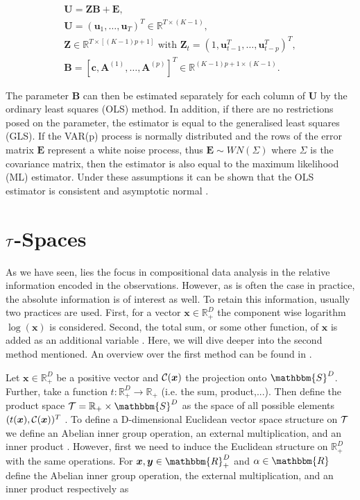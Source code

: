 \begin{gather*}
\textbf{U} = \textbf{ZB} + \textbf{E}, \\
\textbf{U} = (\textbf{u}_1,\ldots,\textbf{u}_T)^T \in \mathbb{R}^{T \times (K-1)}, \\
\textbf{Z} \in \mathbb{R}^{T \times \left[(K-1)p+1\right]} \text{ with } \textbf{Z}_t = \left(1,\textbf{u}_{t-1}^T,\ldots,\textbf{u}_{t-p}^T\right)^T, \\ %
\textbf{B} = \left[\textbf{c},\textbf{A}^{(1)}, \ldots, \textbf{A}^{(p)}\right]^T \in \mathbb{R}^{(K-1)p +1 \times (K-1)}.
\label{eq:VAR model matrix}
\end{gather*}


The parameter $\textbf{B}$ can then be estimated separately for each column of $\textbf{U}$ by the ordinary least squares (OLS) method. In addition, if there are no restrictions posed on the parameter, the estimator is equal to the generalised least squares (GLS). If the VAR(p) process is normally distributed and the rows of the error matrix $\textbf{E}$ represent a white noise process, thus $\bm{E} \sim WN(\Sigma)$ where $\Sigma$ is the covariance matrix, then the estimator is also equal to the maximum likelihood (ML) estimator. 
Under these assumptions it can be shown that the OLS estimator is consistent and asymptotic normal \cite{Kynclova:2015} \cite{Luetkepohl:2007}. 


\section{$\mathcal{T}$-Spaces}
\label{sec: Tspaces}

As we have seen, lies the focus in compositional data analysis in the relative information encoded in the observations. However, as is often the case in practice, the absolute information is of interest as well. To retain this information, usually two practices are used. First, for a vector $\bm{x} \in \mathbb{R}^D_+$ the component wise logarithm $\log(\bm{x})$ is considered. Second, the total sum, or some other function, of $\bm{x}$ is added as an additional variable \cite{Pawlowsky:2013}. Here, we will dive deeper into the second method mentioned. An overview over the first method can be found in \cite{Pawlowsky:2013}. 

Let $\bm{x} \in \mathbb{R}^D_+$ be a positive vector and $\mathcal{C}(\bm{x})$ the projection onto $\mathbbm{S}^D$. Further, take a function $t:\mathbb{R}^D_+ \longrightarrow \mathbb{R}_+$ (i.e. the sum, product,...). Then define the product space  $\Tsp = \mathbb{R}_+ \times \mathbbm{S}^D$ as the space of all possible elements $(t(\bm{x}),\mathcal{C}(\bm{x}))^T$ \cite{Pawlowsky:2013}. To define a D-dimensional Euclidean vector space structure on $\mathcal{T}$ we define an Abelian inner group operation, an external multiplication, and an inner product \cite{Pawlowsky:2013}. However, first we need to induce the Euclidean structure on $\mathbb{R}_+^D$ with the same operations. For $\bm{x},\bm{y} \in \mathbbm{R}_+^D$ and $\alpha \in \mathbbm{R}$ define the Abelian inner group operation, the external multiplication, and an inner product respectively as \cite{Pawlowsky:2013}


